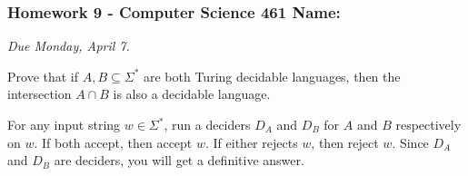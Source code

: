 \documentclass[12pt]{exam}
\begin{document}
\pagestyle{empty}
\subsubsection*{Homework 9 - Computer Science 461 \hfill Name: \underline{\hspace*{2in}}}

\textit{Due Monday, April 7.} %

\begin{questions}

\question Prove that if $A, B \subseteq \Sigma^*$ are both Turing decidable languages, then the intersection $A \cap B$ is also a decidable language. 
\begin{solution}
For any input string $w \in \Sigma^*$, run a deciders $D_A$ and $D_B$ for $A$ and $B$ respectively on $w$.  If both accept, then accept $w$.  If either rejects $w$, then reject $w$.  Since $D_A$ and $D_B$ are deciders, you will get a definitive answer.  
\end{solution}
\vfill




\end{questions}
\end{document}
